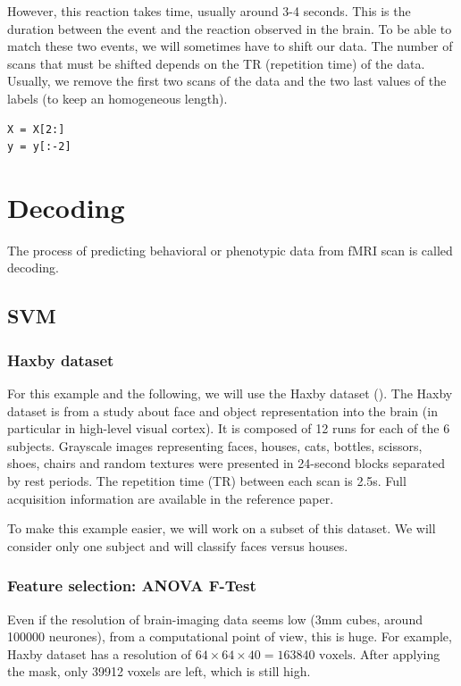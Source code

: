 \documentclass{frontiersSCNS} %
\begin{document}
However, this reaction takes time, usually around 3-4 seconds. This is the
duration between the event and the reaction observed in the brain. To be able to
match these two events, we will sometimes have to shift our data. The number of
scans that must be shifted depends on the TR (repetition time) of the data.
Usually, we remove the first two scans of the data and the two last values of the
labels (to keep an homogeneous length).

\begin{lstlisting}
X = X[2:]
y = y[:-2]
\end{lstlisting}

\section{Decoding}

The process of predicting behavioral or phenotypic data from fMRI scan is
called decoding.

\subsection{SVM}

\subsubsection{Haxby dataset}

For this example and the following, we will use the Haxby dataset
(\cite{haxby2001}).
The Haxby dataset is from a study about face and object representation into the
brain (in particular in high-level visual cortex). It is composed of 12 runs for
each of the 6 subjects. Grayscale images representing faces, houses, cats,
bottles, scissors, shoes, chairs and random textures were presented in
24-second blocks separated by rest periods. The repetition time (TR) between each
scan is 2.5s. Full acquisition information are available in the reference paper.

To make this example easier, we will work on a subset of this dataset. We will
consider only one subject and will classify faces versus houses.

\subsubsection{Feature selection: ANOVA F-Test}

Even if the resolution of brain-imaging data seems low (3mm cubes, around 100000
neurones), from a computational point of view, this is huge. For example,
Haxby dataset has a resolution of $64\times64\times40 = 163840\text{ voxels}$.
After applying the mask, only 39912 voxels are left, which is still high.
\end{document}
